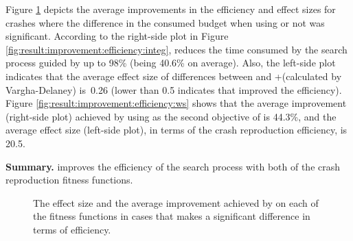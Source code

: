 Figure \ref{fig:result:improvement:efficiency} depicts the average improvements in the efficiency and effect sizes for crashes where the difference in the consumed budget when using \bbc or not was significant.
According to the right-side plot in Figure \ref{fig:result:improvement:efficiency:integ}, \bbc reduces the time consumed by the search process guided by \integ up to 98\% (being 40.6\% on average).
Also, the left-side plot indicates that the average effect size of differences between \integ and \integ+\bbc (calculated by Vargha-Delaney) is~0.26 (lower than 0.5 indicates that \bbc improved the efficiency).
Figure \ref{fig:result:improvement:efficiency:ws} shows that the average improvement (right-side plot) achieved by using \bbc as the second objective of \WS is 44.3\%, and the average effect size (left-side plot), in terms of the crash reproduction efficiency, is 20.5.

\textbf{Summary. } \bbc improves the efficiency of the search process with both of the crash reproduction fitness functions.

\begin{figure}[t]
    \hfil 
    \hfil
    \caption{The effect size and the average improvement achieved by \bbc on each of the fitness functions in cases that \bbc makes a significant difference in terms of efficiency.}
    \label{fig:result:improvement:efficiency}
    \vspace{-2em}
\end{figure} 



